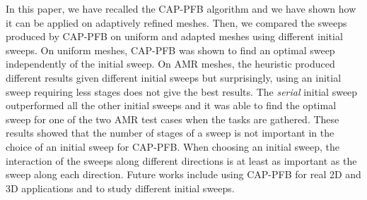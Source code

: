 \documentclass{mc2015}
\renewcommand{\(}{\left(}
\renewcommand{\)}{\right)}
\renewcommand{\[}{\left[}
\renewcommand{\]}{\right]}
\begin{document}
In this paper, we have recalled the CAP-PFB algorithm and we have shown how it
can be applied on adaptively refined meshes. Then, we compared the sweeps
produced by CAP-PFB on uniform and adapted meshes using different initial
sweeps. On uniform meshes, CAP-PFB was shown to find an optimal sweep
independently of the initial sweep. On AMR meshes, the heuristic produced
different results given different initial sweeps but surprisingly, using an
initial sweep requiring less stages does not give the best results. The
\emph{serial} initial sweep outperformed all the other initial sweeps and it was
able to find the optimal sweep for one of the two AMR test cases when the tasks
are gathered. These results showed that the number of stages of a sweep is not
important in the choice of an initial sweep for CAP-PFB. When choosing an
initial sweep, the interaction of the sweeps along different directions is at
least as important as the sweep along each direction. Future works include using
CAP-PFB for real 2D and 3D applications and to study different initial sweeps.


\setlength{\baselineskip}{12pt}




\end{document}
